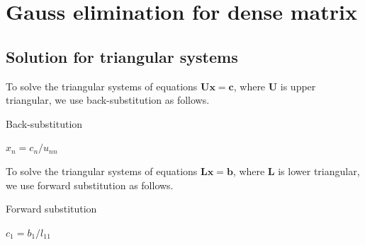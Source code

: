\section{Gauss elimination for dense matrix}
\subsection{Solution for triangular systems}
\begin{alg}
    \label{alg::back-substitution}
    To solve the triangular systems of equations 
    $\mathbf{Ux=c}$, where $\mathbf{U}$ is upper
    triangular, we use back-substitution as follows.
    \IncMargin{1em}
    \begin{algorithm}[H]
        \caption{Back-substitution}


        \BlankLine
        $x_n=c_n/u_{nn}$\;
    \end{algorithm}
    \DecMargin{1em}
\end{alg}

\begin{alg}
    \label{alg::back-substitution}
    To solve the triangular systems of equations 
    $\mathbf{Lx=b}$, where $\mathbf{L}$ is lower
    triangular, we use forward substitution as 
    follows.
    \IncMargin{1em}
    \begin{algorithm}[H]
        \caption{Forward substitution}


        \BlankLine
        $c_1=b_1/l_{11}$\;
    \end{algorithm}
    \DecMargin{1em}
\end{alg}

